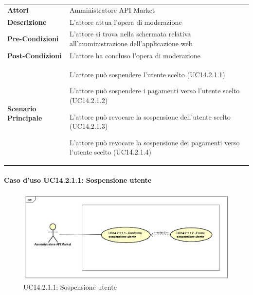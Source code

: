 \begin{minipage}{\linewidth}
	\begin{tabular}{ l | p{11cm}}
		\hline
		\rowcolor{Gray}
		\multicolumn{2}{c}{UC14.2.1 - Moderazione utenza} \\
		\hline
		\textbf{Attori} &  Amministratore API Market \\
		\textbf{Descrizione} & L'attore attua l'opera di moderazione \\
		\textbf{Pre-Condizioni} & L'attore si trova nella schermata relativa all'amministrazione dell'applicazione web \\
		\textbf{Post-Condizioni} & L'attore ha concluso l'opera di moderazione \\
		\textbf{Scenario Principale} & 
		\begin{enumerate*}[label=(\arabic*.),itemjoin={\newline}]
			\item L'attore può sospendere l'utente scelto (UC14.2.1.1)
			\item L'attore può sospendere i pagamenti verso l'utente scelto (UC14.2.1.2)
			\item L'attore può revocare la sospensione dell'utente scelto (UC14.2.1.3)
			\item L'attore può revocare la sospensione dei pagamenti verso l'utente scelto (UC14.2.1.4)
		\end{enumerate*}\\
	\end{tabular}
\end{minipage}

\newpage
\paragraph{Caso d'uso UC14.2.1.1: Sospensione utente}
\label{UC14_2_1_1}
\begin{figure}[ht]
	\centering
	\includegraphics[scale=0.45]{UML/UC14_2_1_1.png}
	\caption{UC14.2.1.1: Sospensione utente}
\end{figure}

